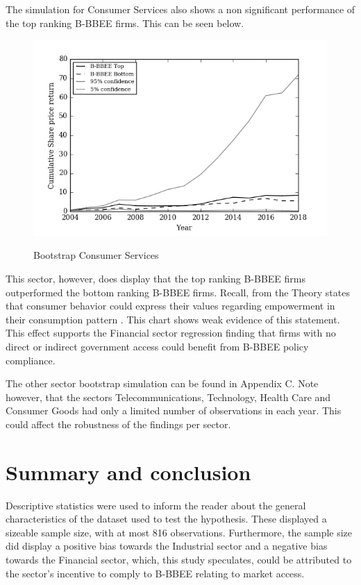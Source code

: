 The simulation for Consumer Services also shows a non significant performance of the top ranking B-BBEE firms. This can be seen below.
\begin{figure}[H]
  \centering
  \includegraphics [scale=1]{"Images/Bootstrap_Consumer Services_Cumulative"} \\
  {\small {\it \caption{Bootstrap Consumer Services \label{fig:moun} }}}
\end{figure}
This sector, however, does display that the top ranking B-BBEE firms outperformed the bottom ranking B-BBEE firms. Recall, from the Theory states that  consumer behavior could express their values regarding empowerment in their consumption pattern \cite[p378]{N34}. This chart shows weak evidence of this statement. This effect supports the Financial sector regression finding that firms with no direct or indirect government access could benefit from B-BBEE policy compliance.

The other sector bootstrap simulation can be found in Appendix C. Note however, that the sectors Telecommunications, Technology, Health Care and Consumer Goods had only a limited number of observations in each year. This could affect the robustness of the findings per sector. 
\section{Summary and conclusion}
Descriptive statistics were used to inform the reader about the general characteristics of the dataset used to test the hypothesis. These displayed a sizeable sample size, with at most 816 observations. Furthermore, the sample size did display a positive bias towards the Industrial sector and a negative bias towards the Financial sector, which, this study speculates, could be attributed to the sector’s incentive to comply to B-BBEE relating to market access.

